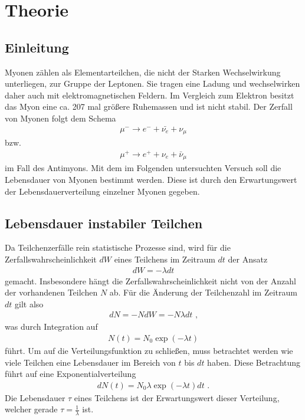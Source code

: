 \section{Theorie}
\label{sec:Theorie}

\subsection{Einleitung}
\label{subsec:Einleitung}
Myonen zählen als Elementarteilchen, die nicht der Starken Wechselwirkung unterliegen, zur Gruppe der Leptonen.
Sie tragen eine Ladung und wechselwirken daher auch mit elektromagnetischen Feldern.
Im Vergleich zum Elektron besitzt das Myon eine ca. 207 mal größere Ruhemassen und ist nicht stabil.
Der Zerfall von Myonen folgt dem Schema
\begin{align}
\mu^- \longrightarrow e^- + \bar{\nu_e} + \nu_\mu
\end{align}
bzw.
\begin{align}
\mu^+ \longrightarrow e^+ + \nu_e + \bar{\nu}_\mu
\end{align}
im Fall des Antimyons.
Mit dem im Folgenden untersuchten Versuch soll die Lebensdauer von Myonen bestimmt werden.
Diese ist durch den Erwartungswert der Lebensdauerverteilung einzelner Myonen gegeben.
\subsection{Lebensdauer instabiler Teilchen}
\label{subsec:Lebensdauer instabiler Teilchen}
Da Teilchenzerfälle rein statistische Prozesse sind, wird für die Zerfallswahrscheinlichkeit $dW$ eines Teilchens im Zeitraum $dt$ der Ansatz
\begin{align}
dW = -  \lambda dt
\end{align} 
gemacht.
Insbesondere hängt die Zerfallswahrscheinlichkeit nicht von der Anzahl der vorhandenen Teilchen $N$ ab.
Für die Änderung der Teilchenzahl im Zeitraum $dt$ gilt also
\begin{align}
dN = - N dW = - N \lambda dt\text{ ,}
\end{align} 
was durch Integration auf 
\begin{align}
N(t)=N_0\exp(-\lambda t)
\end{align}
führt.
Um auf die Verteilungsfunktion zu schließen, muss betrachtet werden wie viele Teilchen eine Lebensdauer im Bereich von $t$ bis $dt$ haben.
Diese Betrachtung führt auf eine Exponentialverteilung
\begin{align}
dN(t)=N_0 \lambda \exp(-\lambda t) dt \text{ .}
\end{align}
Die Lebensdauer $\tau$ eines Teilchens ist der Erwartungswert dieser Verteilung, welcher gerade $\tau = \frac{1}{\lambda}$ ist.
\cite{sample}
